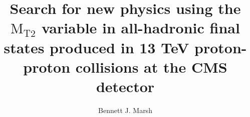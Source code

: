 

\title{
Search for new physics using the $\text{M}_\text{T2}$ variable in all-hadronic final states 
produced in 13 TeV proton-proton collisions at the CMS detector
}

\author{Bennett J. Marsh}

  



